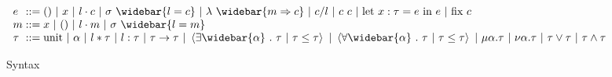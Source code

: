 \documentclass[sigplan]{acmart}
\theoremstyle{definition}
\newtheorem{definition}{Definition}[section]
\begin{document}
\begin{figure*}
\[
  \begin{array}{l @{} l}
    e 
    &{} ::=
    \begin{array}[t]{@{} l}
      () 
      \ |\ 
      x
      \ |\ 
      l \cdot c 
      \ |\ 
      \sigma\ \widebar{l = c}
      \ |\ 
      \lambda\ \widebar{m \Rightarrow c} 
      \ |\ 
      c/l
      \ |\ 
      c\ c 
      \ |\ 
      \text{let}\ x : \tau = e\ \text{in}\ e
      \ |\ 
      \text{fix}\ c
    \end{array}
    \\
    m 
    &{} ::=
    \begin{array}[t]{@{} l}
      x 
      \ |\ 
      () 
      \ |\ 
      l \cdot m 
      \ |\ 
      \sigma\ \widebar{l = m}
    \end{array}
    \\
    \tau
    &{} ::=
    \begin{array}[t]{@{} l}
      \text{unit} 
      \ |\ 
      \alpha 
      \ |\ 
      l*\tau 
      \ |\ 
      l:\tau 
      \ |\ 
      \tau\rightarrow\tau 
      \ |\ 
      \left<\exists \widebar{\alpha}\ .\ \tau\ |\ \tau \leq \tau\right>
      \ |\ 
      \left<\forall \widebar{\alpha}\ .\ \tau\ |\ \tau \leq \tau\right>
      \ |\ 
      \mu \alpha.\tau 
      \ |\ 
      \nu \alpha.\tau 
      \ |\ 
      \tau \vee \tau
      \ |\ 
      \tau \wedge \tau
    \end{array}
  \end{array}
\]

\caption{Syntax}
\end{figure*}



  




\end{document}
